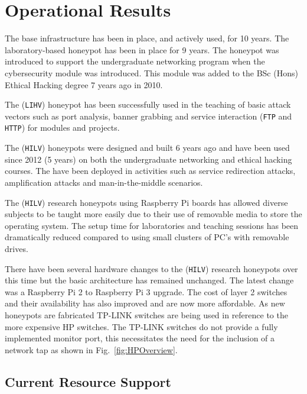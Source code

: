 \documentclass{llncs}
\begin{document}
\section{Operational Results\label{Results}}

The base infrastructure has been in place, and actively used, for 10 years. The
laboratory-based honeypot has been in place for 9 years. The honeypot was
introduced to support the undergraduate networking program when the
cybersecurity module was introduced. This module was added to the BSc (Hons)
Ethical Hacking degree 7 years ago in 2010.

The (\texttt{LIHV}) honeypot has been successfully used in the teaching of
basic attack vectors such as port analysis, banner grabbing and service
interaction (\texttt{FTP} and \texttt{HTTP}) for modules and projects.

The (\texttt{HILV}) honeypots were designed and built 6 years ago and have been
used since 2012 (5 years) on both the undergraduate networking and ethical
hacking courses. The have been deployed in activities such as service
redirection attacks, amplification attacks and man-in-the-middle scenarios.

The (\texttt{HILV}) research honeypots using Raspberry Pi boards has allowed
diverse subjects to be taught more easily due to their use of removable media
to store the operating system. The setup time for laboratories and teaching
sessions has been dramatically reduced compared to using small clusters of PC's
with removable drives.

There have been several hardware changes to the (\texttt{HILV}) research
honeypots over this time but the basic architecture has remained unchanged. The
latest change was a Raspberry Pi 2 to Raspberry Pi 3 upgrade. The cost of layer
2 switches and their availability has also improved and are now more
affordable. As new honeypots are fabricated TP-LINK switches are being used in
reference to the more expensive HP switches. The TP-LINK switches do not
provide a fully implemented monitor port, this necessitates the need for the
inclusion of a network tap as shown in Fig.~\ref{fig:HPOverview}.

\subsection{Current Resource Support\label{ResourceSupport}}
\end{document}
